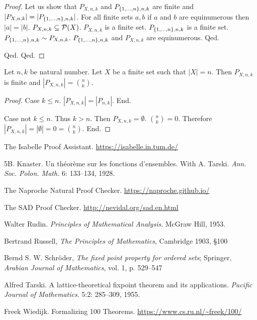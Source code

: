 \documentclass{article}
\begin{document}
\begin{forthel}
\begin{proof}
Let us show that $P_{X,n,k}$ and $P_{\{1,\dots,n\},n,k}$ are finite and $|P_{X,n,k}|=|P_{\{1,\dots,n\},n,k}|$.
For all finite sets $a,b$ if $a$ and $b$ are equinumerous then $|a|=|b|$.
$P_{X,n,k} \subseteq {\cal P}(X)$.
$P_{X,n,k}$ is a finite set.
$P_{\{1,\dots,n\},n,k}$ is a finite set.
$P_{\{1,\dots,n\},n,k} \sim P_{X,n,k}$.
$P_{\{1,\dots,n\},n,k}$ and $P_{X,n,k}$ are equinumerous.
Qed.

Qed.
Qed.
\end{proof}

\begin{theorem}
Let $n,k$ be natural number.
Let $X$ be a finite set such that $|X|=n$.
Then $P_{X,n,k}$ is finite and $|P_{X,n,k}|=\binom{n}{k}$.
\end{theorem}
\begin{proof}
Case $k \leq n$.
$|P_{X,n,k}|=|P_{n,k}|$.
End.

Case not $k \leq n$.
Thus $k > n$.
Then $P_{X,n,k} = \emptyset$.
$\binom{n}{k}=0$.
Therefore $|P_{X,n,k}| = |\emptyset| = 0 = \binom{n}{k}$.
End.
\end{proof}


\end{forthel}



\begin{thebibliography}{plain}

 The Isabelle Proof Assistant. \url{https://isabelle.in.tum.de/}

5B. Knaster. Un théorème sur les fonctions d'ensembles. With A. Tarski. 
\textit{Ann. Soc. Polon. Math.} 6: 133–134, 1928.

 The Naproche Natural Proof Checker. \url{https://naproche.github.io/}

 The SAD Proof Checker. \url{http://nevidal.org/sad.en.html}

 Walter Rudin. \textit{Principles of Mathematical
Analysis}. McGraw Hill, 1953.

 Bertrand Russell,
{\em The Principles of Mathematics}, Cambridge 1903, {\S}100

 Bernd S. W. Schröder,
\textit{The fixed point property for ordered sets};
Springer, \textit{Arabian Journal of Mathematics}, vol. 1, p. 529--547

Alfred Tarski. A lattice-theoretical fixpoint theorem and its applications. 
\textit{Pacific Journal of Mathematics}. 5:2: 285–309, 1955.

 Freek Wiedijk. Formalizing 100 Theorems. \url{https://www.cs.ru.nl/~freek/100/}

\end{thebibliography}
\end{document}
